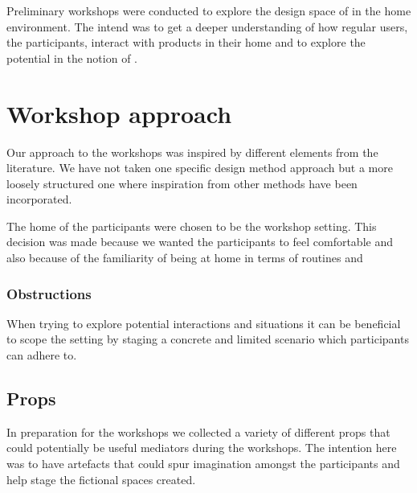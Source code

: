 

Preliminary workshops were conducted to explore the design space of  in the home environment.
The intend was to get a deeper understanding of how regular users, the participants, interact with products in their home and to explore the potential in the notion of .

\section{Workshop approach}
\label{ch:workshops:approach}
Our approach to the workshops was inspired by different elements from the literature. \todo{\dots}
We have not taken one specific design method approach but a more loosely structured one where inspiration from other methods have been incorporated.

The home of the participants were chosen to be the workshop setting.
This decision was made because we wanted the participants to feel comfortable and also because of the familiarity of being at home in terms of routines and 

\subsubsection{Obstructions}
\label{ch:workshops:approach:obstructions}

When trying to explore potential interactions and situations it can be beneficial to scope the setting by staging a concrete and limited scenario which participants can adhere to.







\subsection{Props}
\label{ch:workshops:approach:props}

In preparation for the workshops we collected a variety of different props that could potentially be useful mediators during the workshops.
The intention here was to have artefacts that could spur imagination amongst the participants and help stage the fictional spaces created.

